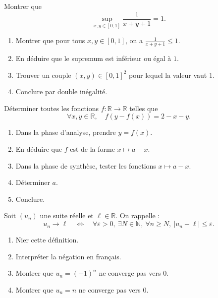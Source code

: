 \documentclass[11pt,a4paper]{article}
\newcommand{\N}{\mathbb{N}}
\newcommand{\R}{\mathbb{R}}
\newcommand{\eps}{\varepsilon}
\begin{document}
\begin{exercicebox}
Montrer que
\[
\sup_{x,y\in[0,1]} \frac{1}{x+y+1}=1.
\]

\begin{enumerate}[label=\alph*)]
    \item Montrer que pour tous \(x,y\in[0,1]\), on a \(\frac1{x+y+1}\leq1\).
    \item En déduire que le supremum est inférieur ou égal à \(1\).
    \item Trouver un couple \((x,y)\in[0,1]^2\) pour lequel la valeur vaut \(1\).
    \item Conclure par double inégalité.
\end{enumerate}
\end{exercicebox}

\begin{exercicebox}
Déterminer toutes les fonctions \(f:\R\to\R\) telles que
\[
\forall x,y\in\R,\quad f(y-f(x))=2-x-y.
\]

\begin{enumerate}[label=\alph*)]
    \item Dans la phase d'analyse, prendre \(y=f(x)\).
    \item En déduire que \(f\) est de la forme \(x\mapsto a-x\).
    \item Dans la phase de synthèse, tester les fonctions \(x\mapsto a-x\).
    \item Déterminer \(a\).
    \item Conclure.
\end{enumerate}
\end{exercicebox}

\begin{exercicebox}
Soit \((u_n)\) une suite réelle et \(\ell\in\R\). On rappelle :
\[
u_n\to\ell
\quad\Longleftrightarrow\quad
\forall \eps>0,\ \exists N\in\N,\ \forall n\geq N,\ |u_n-\ell|\leq\eps.
\]

\begin{enumerate}[label=\alph*)]
    \item Nier cette définition.
    \item Interpréter la négation en français.
    \item Montrer que \(u_n=(-1)^n\) ne converge pas vers \(0\).
    \item Montrer que \(u_n=n\) ne converge pas vers \(0\).
\end{enumerate}
\end{exercicebox}
\end{document}
